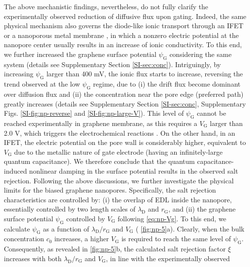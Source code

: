 The above mechanistic findings, nevertheless, do not fully clarify the
experimentally observed reduction of diffusive flux upon
gating. Indeed, the same physical mechanism also governs the {
  diode-like ionic transport through an IFET
  \cite{Nam_2009_IFET_sub10nm,Lee_2015_sub10nm,Feng_2016_porous_MoS2} or a nanoporous metal membrane
  \cite{Mccurry_2017_electrolyte_porus_gold}}, in which a nonzero electric
potential at the nanopore center usually results in an increase of
ionic conductivity. To this end, we further increased the graphene
surface potential $\psi_{\mathrm{G}}$ considering the same system
(details see Supplementary Section \autoref{SI-sec:conc}). Intriguingly,
by increasing $\psi_{\mathrm{G}}$ larger than 400 mV, the ionic flux
starts to increase, reversing the trend observed at the low
$\psi_{\mathrm{G}}$ regime, due to (i) the drift flux become dominant
over diffusion flux and (ii) the concentration near the pore edge
(preferred path) greatly increases (details see Supplementary Section
\autoref{SI-sec:conc}, Supplementary Figs. \autoref{SI-fig:np-reverse} and
\autoref{SI-fig:np-large-V}). This level of $\psi_{\mathrm{G}}$ cannot be
reached experimentally in graphene membrane, as this requires a
$V_{\mathrm{G}}$ larger than 2.0 V, which triggers the electrochemical
reactions \cite{Toh_2011_GO_electrochem}. On the other hand, in an IFET, the electric
potential on the pore wall is considerably higher, equivalent to
$V_{\mathrm{G}}$ due to the metallic nature of gate electrode (having
an infinitely-large quantum capacitance). We therefore conclude that
the quantum capacitance-induced nonlinear damping in the surface
potential results in the observed salt rejection.  Following the above
discussions, we further investigate the physical limits for the biased
graphene nanopores. Specifically, the salt rejection characteristics
are controlled by: (i) the overlap of EDL inside the nanopore,
essentially controlled by two length scales of $\lambda_{\mathrm{D}}$
and $r_{\mathrm{G}}$, and (ii) the graphene surface potential
$\psi_{\mathrm{G}}$ controlled by $V_{\mathrm{G}}$ following
 \autoref{eq:np-Vg}. To this end, we calculate $\psi_{\mathrm{G}}$ as a
function of $\lambda_{\mathrm{D}} / r_{\mathrm{G}}$ and
$V_{\mathrm{G}}$ ( \autoref{fig:np-5}a). Clearly, when the bulk
concentration $c_{0}$ increases, a higher $V_{\mathrm{G}}$ is required
to reach the same level of $\psi_{\mathrm{G}}$. Consequently, as
revealed in  \autoref{fig:np-5}b, the calculated salt rejection factor
$\xi$ increases with both $\lambda_{\mathrm{D}} / r_{\mathrm{G}}$ and
$V_{\mathrm{G}}$, in line with the experimentally observed
